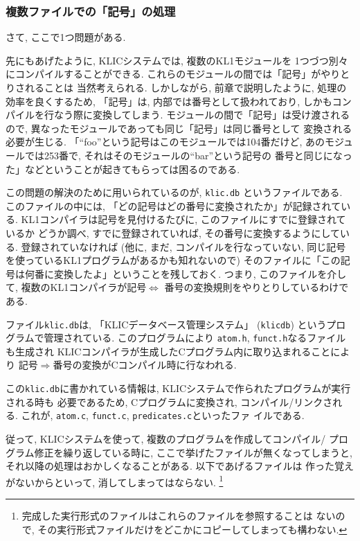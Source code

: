 \documentclass[a4,titlepage]{jsreport}
\begin{document}
\subsubsection{複数ファイルでの「記号」の処理}
さて, ここで1つ問題がある.  

先にもあげたように, KLICシステムでは, 複数のKL1モジュールを
1つづつ別々にコンパイルすることができる.  
これらのモジュールの間では「記号」がやりとりされることは
当然考えられる.  しかしながら, 前章で説明したように, 
処理の効率を良くするため, 「記号」は, 内部では番号として扱われており, 
しかもコンパイルを行なう際に変換してしまう.  
モジュールの間で「記号」は受け渡されるので, 
異なったモジュールであっても同じ「記号」は同じ番号として
変換される必要が生じる.  「``foo''という記号はこのモジュールでは104番だけど, 
あのモジュールでは253番で, それはそのモジュールの``bar''という記号の
番号と同じになった」などということが起きてもらっては困るのである.  

この問題の解決のために用いられているのが, \verb|klic.db|
というファイルである.  
このファイルの中には, 
「どの記号はどの番号に変換されたか」が記録されている.  
KL1コンパイラは記号を見付けるたびに, このファイルにすでに登録されているか
どうか調べ, すでに登録されていれば, その番号に変換するようにしている.  
登録されていなければ (他に, まだ, コンパイルを行なっていない, 
同じ記号を使っているKL1プログラムがあるかも知れないので) 
そのファイルに「この記号は何番に変換したよ」ということを残しておく.  
つまり, このファイルを介して, 複数のKL1コンパイラが記号$\Leftrightarrow$
番号の変換規則をやりとりしているわけである.  

ファイル\verb|klic.db|は, 「KLICデータベース管理システム」
(\verb|klicdb|) というプログラムで管理されている.  
このプログラムにより
\verb|atom.h|, \verb|funct.h|なるファイルも生成され
KLICコンパイラが生成したCプログラム内に取り込まれることにより
記号$\Rightarrow$番号の変換がCコンパイル時に行なわれる.  

この\verb|klic.db|に書かれている情報は, 
KLICシステムで作られたプログラムが実行される時も
必要であるため, Cプログラムに変換され, コンパイル/リンクされる.  
これが, \verb|atom.c|, \verb|funct.c|, \verb|predicates.c|といったファ
イルである. 

従って, KLICシステムを使って, 複数のプログラムを作成してコンパイル/
プログラム修正を繰り返している時に, ここで挙げたファイルが無くなってしまうと, 
それ以降の処理はおかしくなることがある.  以下であげるファイルは
作った覚えがないからといって, 消してしまってはならない.  
\footnote{完成した実行形式のファイルはこれらのファイルを参照することは
ないので, その実行形式ファイルだけをどこかにコピーしてしまっても構わない.  }
\end{document}
